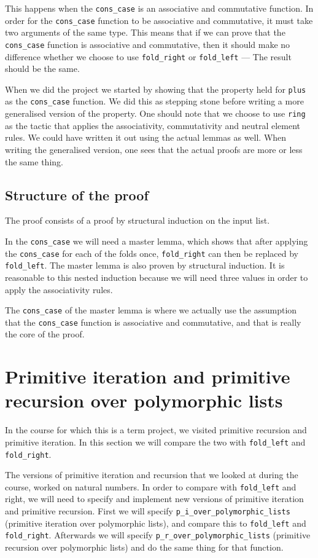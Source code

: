 \documentclass[a4paper]{article}
\begin{document}
This happens when the \texttt{cons\_case} is an associative and commutative
function. In order for the \texttt{cons\_case} function to be associative and
commutative, it must take two arguments of the same type. This means that if we
can prove that the \texttt{cons\_case} function is associative and commutative,
then it should make no difference whether we choose to use \texttt{fold\_right}
or \texttt{fold\_left} --- The result should be the same.

When we did the project we started by showing that the property held for
\texttt{plus} as the \texttt{cons\_case} function. We did this as stepping
stone before writing a more generalised version of the property. One should
note that we choose to use \texttt{ring} as the tactic that applies the
associativity, commutativity and neutral element rules. We could have written
it out using the actual lemmas as well. When writing the generalised version,
one sees that the actual proofs are more or less the same thing.

\subsection{Structure of the proof}
The proof consists of a proof by structural induction on the input list.

In the \texttt{cons\_case} we will need a master lemma, which shows that after
applying the \texttt{cons\_case} for each of the folds once,
\texttt{fold\_right} can then be replaced by \texttt{fold\_left}. The master
lemma is also proven by structural induction. It is reasonable to this nested
induction because we will need three values in order to apply the associativity
rules.

The \texttt{cons\_case} of the master lemma is where we actually use the
assumption that the \texttt{cons\_case} function is associative and
commutative, and that is really the core of the proof.

\section{Primitive iteration and primitive recursion over polymorphic lists}
In the course for which this is a term project, we visited primitive recursion
and primitive iteration. In this section we will compare the two with
\texttt{fold\_left} and \texttt{fold\_right}.

The versions of primitive iteration and recursion that we looked at during the
course, worked on natural numbers. In order to compare with \texttt{fold\_left}
and right, we will need to specify and implement new versions of primitive
iteration and primitive recursion. First we will specify
\texttt{p\_i\_over\_polymorphic\_lists} (primitive iteration over polymorphic
lists), and compare this to \texttt{fold\_left} and \texttt{fold\_right}.
Afterwards we will specify \texttt{p\_r\_over\_polymorphic\_lists} (primitive
recursion over polymorphic lists) and do the same thing for that function.
\end{document}
